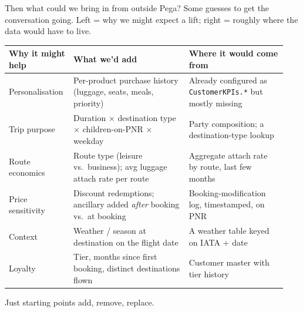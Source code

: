 \documentclass[aspectratio=169,11pt]{beamer}
\begin{document}
\begin{frame}{Then \textemdash{} what could we bring in from outside Pega?}
  \vspace{-0.3em}
  \footnotesize
  Some guesses to get the conversation going. Left = why we might expect a lift; right = roughly where the data would have to live.
  \vspace{0.2em}
  \scriptsize
  \renewcommand{\arraystretch}{1.05}
  \begin{tabular}{@{}p{0.20\linewidth} p{0.40\linewidth} p{0.34\linewidth}@{}}
    \toprule
    \textbf{Why it might help} & \textbf{What we'd add} & \textbf{Where it would come from} \\
    \midrule
    Personalisation
      & Per-product purchase history (luggage, seats, meals, priority)
      & Already configured as \texttt{CustomerKPIs.*} but mostly missing \\[0.2em]
    Trip purpose
      & Duration \(\times\) destination type \(\times\) children-on-PNR \(\times\) weekday
      & Party composition; a destination-type lookup \\[0.2em]
    Route economics
      & Route type (leisure vs.\ business); avg luggage attach rate per route
      & Aggregate attach rate by route, last few months \\[0.2em]
    Price sensitivity
      & Discount redemptions; ancillary added \emph{after} booking vs.\ at booking
      & Booking-modification log, timestamped, on PNR \\[0.2em]
    Context
      & Weather / season at destination on the flight date
      & A weather table keyed on IATA + date \\[0.2em]
    Loyalty
      & Tier, months since first booking, distinct destinations flown
      & Customer master with tier history \\
    \bottomrule
  \end{tabular}
  \vspace{0.2em}
  \normalsize
  {\scriptsize\textcolor{accgray}{Just starting points \textemdash{} add, remove, replace.}}
\end{frame}
\end{document}
